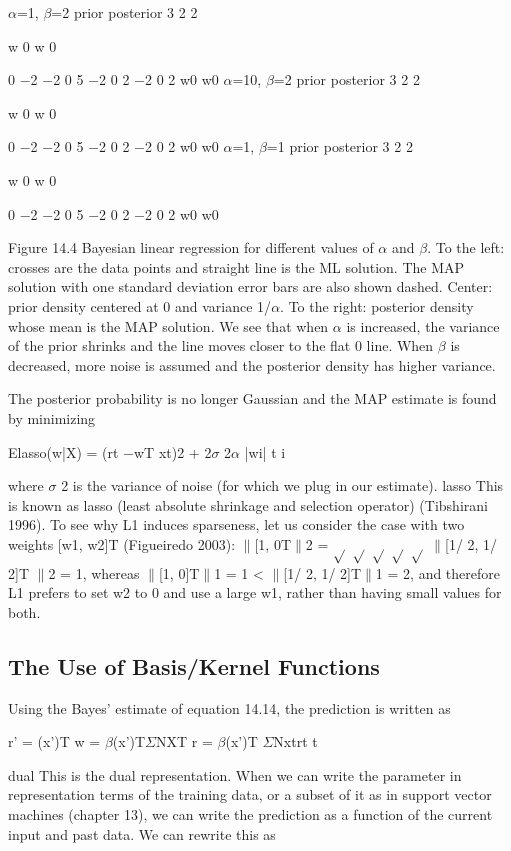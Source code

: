 $\alpha$=1, $\beta$=2 prior posterior 3 2 2

w 0 w 0

0 $-$2 $-$2 0 5 $-$2 0 2 $-$2 0 2 w0 w0 $\alpha$=10, $\beta$=2 prior posterior 3 2 2

w 0 w 0

0 $-$2 $-$2 0 5 $-$2 0 2 $-$2 0 2 w0 w0 $\alpha$=1, $\beta$=1 prior posterior 3 2 2

w 0 w 0

0 $-$2 $-$2 0 5 $-$2 0 2 $-$2 0 2 w0 w0

Figure 14.4 Bayesian linear regression for different values of $\alpha$ and $\beta$. To the left: crosses are the data points and straight line is the ML solution. The MAP solution with one standard deviation error bars are also shown dashed. Center: prior density centered at 0 and variance 1/$\alpha$. To the right: posterior density whose mean is the MAP solution. We see that when $\alpha$ is increased, the variance of the prior shrinks and the line moves closer to the flat 0 line. When $\beta$ is decreased, more noise is assumed and the posterior density has higher variance.

The posterior probability is no longer Gaussian and the MAP estimate is found by minimizing

Elasso(w|X) = (rt $-$wT xt)2 + 2$\sigma$ 2$\alpha$ |wi| t i

where $\sigma$ 2 is the variance of noise (for which we plug in our estimate). lasso This is known as lasso (least absolute shrinkage and selection operator) (Tibshirani 1996). To see why L1 induces sparseness, let us consider the case with two weights [w1, w2]T (Figueiredo 2003): $\parallel$[1, 0T$\parallel$2 = $\sqrt{}$ $\sqrt{}$ $\sqrt{}$ $\sqrt{}$ $\sqrt{}$ $\parallel$[1/ 2, 1/ 2]T $\parallel$2 = 1, whereas $\parallel$[1, 0]T$\parallel$1 = 1 < $\parallel$[1/ 2, 1/ 2]T$\parallel$1 = 2, and therefore L1 prefers to set w2 to 0 and use a large w1, rather than having small values for both.

\subsection{The Use of Basis/Kernel Functions}

Using the Bayes’ estimate of equation 14.14, the prediction is written as

r' = (x')T w = $\beta$(x')T$\Sigma$NXT r = $\beta$(x')T $\Sigma$Nxtrt t

dual This is the dual representation. When we can write the parameter in representation terms of the training data, or a subset of it as in support vector machines (chapter 13), we can write the prediction as a function of the current input and past data. We can rewrite this as

